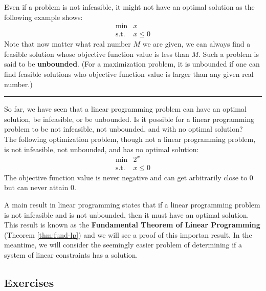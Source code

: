 Even if a problem is not infeasible, it might not have an optimal
solution as the following example shows: \[
\begin{array}{rl}
\min & x \\
\text{s.t.} &  x \leq 0
\end{array}
\] Note that now matter what real number \(M\) we are given, we can
always find a feasible solution whose objective function value is less
than \(M\). Such a problem is said to be \textbf{unbounded}. (For a
maximization problem, it is unbounded if one can find feasible solutions
who objective function value is larger than any given real number.)

\begin{center}\rule{0.5\linewidth}{\linethickness}\end{center}

So far, we have seen that a linear programming problem can have an
optimal solution, be infeasible, or be unbounded. Is it possible for a
linear programming problem to be not infeasible, not unbounded, and with
no optimal solution?\\
The following optimization problem, though not a linear programming
problem, is not infeasible, not unbounded, and has no optimal solution:
\[
\begin{array}{rl}
\min & 2^x \\
\text{s.t.} &  x \leq 0
\end{array}
\] The objective function value is never negative and can get
arbitrarily close to 0 but can never attain 0.

A main result in linear programming states that if a linear programming
problem is not infeasible and is not unbounded, then it must have an
optimal solution. This result is known as the \textbf{Fundamental
Theorem of Linear Programming} (Theorem \ref{thm:fund-lp}) and we will
see a proof of this importan result. In the meantime, we will consider
the seemingly easier problem of determining if a system of linear
constraints has a solution.

\subsection*{Exercises}\label{exercises-1}

